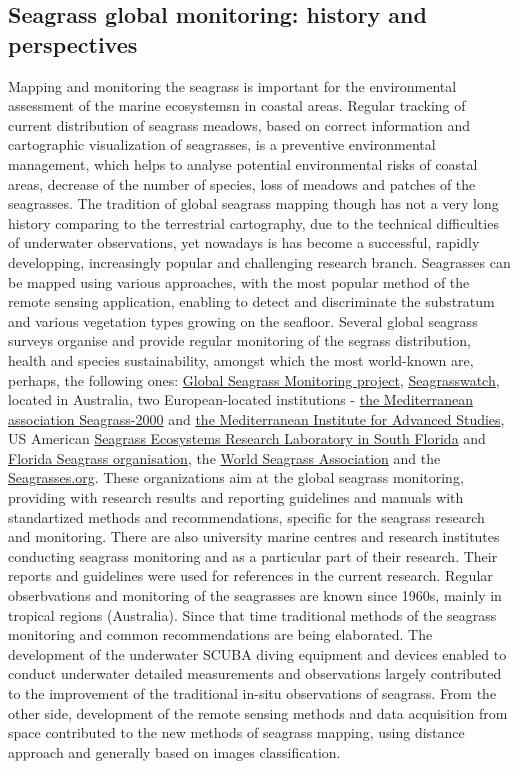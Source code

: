 \documentclass[10pt, a4paper]{article}
\begin{document}
\subsection{Seagrass global monitoring: history and perspectives}
Mapping and monitoring the seagrass is important for the environmental assessment of the marine
ecosystemsn in coastal areas. Regular tracking of current distribution of seagrass meadows, based on
correct information and cartographic visualization of seagrasses, is a preventive environmental
management, which helps to analyse potential environmental risks of coastal areas, decrease of the
number of species, loss of meadows and patches of the seagrasses.
The tradition of global seagrass mapping though has not a very long history comparing to the
terrestrial cartography, due to the technical difficulties of underwater observations, yet nowadays is
has become a successful, rapidly developping, increasingly popular and challenging research branch.
Seagrasses can be mapped using various approaches, with the most popular method of the remote
sensing application, enabling to detect and discriminate the substratum and various vegetation types
growing on the seafloor.
Several global seagrass surveys organise and provide regular monitoring of the segrass distribution,
health and species sustainability, amongst which the most world-known are, perhaps, the following
ones: \href{http://www.seagrassnet.org/}{Global Seagrass Monitoring project}, \href{http://www.seagrasswatch.org/}{Seagrasswatch}, 
located in Australia, two European-located institutions - \href{http://mediterranean.seagrassonline.org/}{the Mediterranean association Seagrass-2000} and \href{http://www.imedea.uib.es/index.php}{the Mediterranean Institute for Advanced Studies}, US American 
\href{http://www2.fiu.edu/~seagrass/}{Seagrass Ecosystems Research Laboratory in South Florida} and
\href{http://www.flseagrass.org/}{Florida Seagrass organisation}, the \href{http://wsa.seagrassonline.org/}{World Seagrass Association} and  
the \href{http://www.seagrasses.org/}{Seagrasses.org}.
 These organizations aim at the global seagrass monitoring, providing with
research results and reporting guidelines and manuals with standartized methods and
recommendations, specific for the seagrass research and monitoring. There are also university marine
centres and research institutes conducting seagrass monitoring and as a particular part of their
research. Their reports and guidelines were used for references in the current research.
Regular obserbvations and monitoring of the seagrasses are known since 1960s, mainly in tropical
regions (Australia). Since that time traditional methods of the seagrass monitoring and common
recommendations are being elaborated. The development of the underwater SCUBA diving
equipment and devices enabled to conduct underwater detailed measurements and observations
largely contributed to the improvement of the traditional in-situ observations of seagrass. From the
other side, development of the remote sensing methods and data acquisition from space contributed to
the new methods of seagrass mapping, using distance approach and generally based on images
classification.
\end{document}
